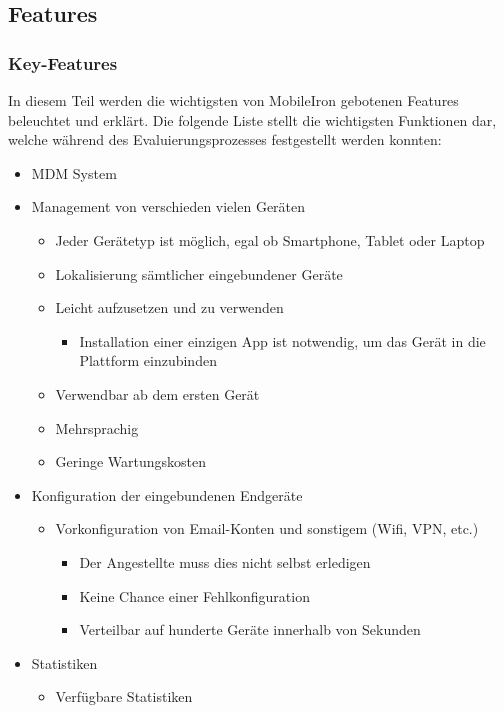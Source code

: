 \newpage

\subsection{Features}
\subsubsection{Key-Features}
In diesem Teil werden die wichtigsten von MobileIron gebotenen Features beleuchtet und erklärt. Die folgende Liste stellt die wichtigsten Funktionen dar, welche während des Evaluierungsprozesses festgestellt werden konnten:
\begin{itemize}
	\item MDM System
	\item Management von verschieden vielen Geräten
	\begin{itemize}
		\item Jeder Gerätetyp ist möglich, egal ob Smartphone, Tablet oder Laptop
		\item Lokalisierung sämtlicher eingebundener Geräte
		\item Leicht aufzusetzen und zu verwenden
		\begin{itemize}
			\item Installation einer einzigen App ist notwendig, um das Gerät in die Plattform einzubinden
		\end{itemize}
		\item Verwendbar ab dem ersten Gerät
		\item Mehrsprachig
		\item Geringe Wartungskosten
	\end{itemize}
	\item Konfiguration der eingebundenen Endgeräte
	\begin{itemize}
		\item Vorkonfiguration von Email-Konten und sonstigem (Wifi, VPN, etc.)
		\begin{itemize}
			\item Der Angestellte muss dies nicht selbst erledigen
			\item Keine Chance einer Fehlkonfiguration
			\item Verteilbar auf hunderte Geräte innerhalb von Sekunden
		\end{itemize}
	\end{itemize}
	\item Statistiken
	\begin{itemize}
		\item Verfügbare Statistiken 

\end{itemize}
\end{itemize}
